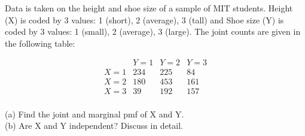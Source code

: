 \begin{exercise}
Data is taken on the height and shoe size of a sample of MIT students. Height (X) is coded by 3 values: 1 (short), 2 (average), 3 (tall) and Shoe size (Y) is coded by 3 values: 1 (small), 2 (average), 3 (large). The joint counts are given in the following table:

\[
\begin{array}{c|c|c|c}
& Y=1 & Y=2 & Y=3 \\
\hline
X=1 & 234 & 225 & 84 \\
\hline
X=2 & 180 & 453 & 161 \\
\hline
X=3 & 39 & 192 & 157 \\
\end{array}
\]

(a) Find the joint and marginal pmf of X and Y. \\
(b) Are X and Y independent? Discuss in detail.
\end{exercise}

